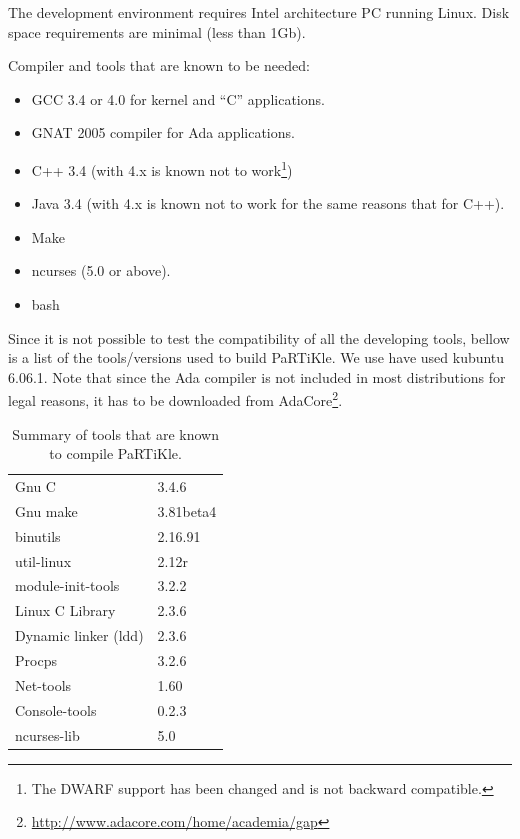 \documentclass[a4paper,10pt,twoside]{report}
\newcommand{\partikle}[0]{PaRTiKle}
\begin{document}
The development environment requires Intel architecture PC running
Linux. Disk space requirements are minimal (less than 1Gb).

Compiler and tools that are known to be needed:
\begin{itemize}
\item GCC 3.4 or 4.0 for kernel and ``C'' applications.
\item GNAT 2005 compiler for Ada applications.
\item C++  3.4 (with 4.x is known not to work\footnote{The DWARF
    support has been changed and is not backward compatible.})
\item Java 3.4 (with 4.x is known not to work for the same reasons
  that for C++).
\item Make
\item ncurses (5.0 or above).
\item bash
\end{itemize}



Since  it  is  not possible  to  test  the  compatibility of  all  the
developing tools, bellow is a list of the tools/versions used to build
\partikle{}. We  use have used kubuntu  6.06.1. Note that  since the Ada
compiler is not  included in most distributions for  legal reasons, it
has            to             be            downloaded            from
AdaCore\footnote{\url{http://www.adacore.com/home/academia/gap}}.




\begin{table}[htb]\centering
\begin{tabular}{l|l}\hline
Gnu C       &           3.4.6 \\ 
Gnu make    &           3.81beta4\\
binutils    &           2.16.91\\
util-linux   &          2.12r\\
module-init-tools &     3.2.2\\
Linux C Library   &     2.3.6\\
Dynamic linker (ldd) &  2.3.6\\
Procps            &     3.2.6\\
Net-tools         &     1.60\\
Console-tools     &     0.2.3\\
ncurses-lib    & 5.0\\ \hline
\end{tabular}
\caption{Summary of tools that are known to compile PaRTiKle.}
\end{table}
\end{document}
